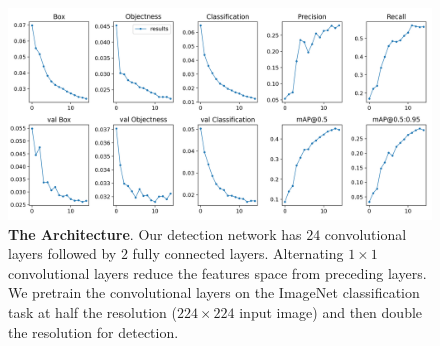\begin{figure}[H] %
  \centering
  \includegraphics[width=\textwidth]{figures/paper/results.png}
  \caption[The Architecture]{\textbf{The Architecture}. Our detection network has $24$ convolutional layers followed by $2$ fully connected layers. Alternating $1 \times 1$ convolutional layers reduce the features space from preceding layers. We pretrain the convolutional layers on the ImageNet classification task at half the resolution ($224 \times 224$ input image) and then double the resolution for detection.}
  \label{fig:figures/paper/results}
\end{figure}

